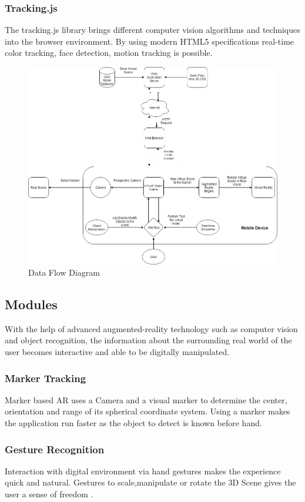 \documentclass[conference]{IEEEtran}
\begin{document}
\subsubsection{Tracking.js} The tracking.js library brings different computer vision algorithms and techniques into the browser environment. By using modern HTML5 specifications real-time color tracking, face detection, motion tracking is possible.
\begin{figure}
	\includegraphics[width=\linewidth]{dataflow.jpg}
	\caption{Data Flow Diagram}
	\label{fig:data-flow}
\end{figure}
\subsection{Modules}
With the help of advanced augmented-reality technology such as computer vision and object recognition, the information about the surrounding real world of the user becomes interactive and able to be digitally manipulated. 
\subsubsection{Marker Tracking}
Marker based AR uses a Camera and a visual marker to determine the center, orientation and range of its spherical coordinate system. Using a marker makes the application run faster as the object to detect is known before hand.
\subsubsection{Gesture Recognition}
Interaction with digital environment via hand gestures makes the experience quick and natural. Gestures to scale,manipulate or rotate the 3D Scene gives the user a sense of freedom .
\end{document}
